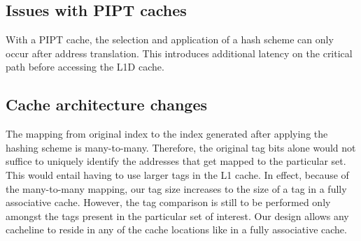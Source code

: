 \subsection{Issues with PIPT caches}
With a PIPT cache, the selection and application of a hash scheme can only occur after address translation. This introduces additional latency on the critical path before accessing the L1D cache. 


\subsection{Cache architecture changes}
The mapping from original index to the index generated after applying the hashing scheme is many-to-many. Therefore, the original tag bits alone would not suffice to uniquely identify the addresses that get mapped to the particular set. This would entail having to use larger tags in the L1 cache. In effect, because of the many-to-many mapping, our tag size increases to the size of a tag in a fully associative cache. However, the tag comparison is still to be performed only amongst the tags present in the particular set of interest. Our design allows any cacheline to reside in any of the cache locations like in a fully associative cache.  

